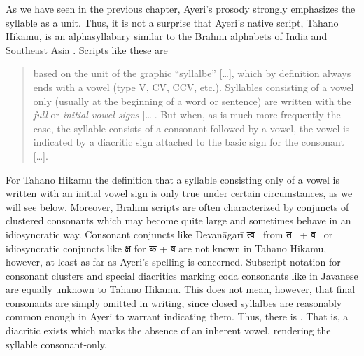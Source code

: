 As we have seen in the previous chapter, Ayeri's prosody strongly emphasizes
the syllable as a unit. Thus, it is not a surprise that Ayeri's native script,
Tahano Hikamu, is an alphasyllabary similar to the Brāhmī
alphabets of India and Southeast Asia \parencites{salomon1996}{court1996}.
Scripts like these are

\blockcquote[376]{salomon1996}{based on the unit of the graphic 
\enquote{syllalbe} […], which by definition always ends with a vowel (type V, 
CV, CCV, etc.). Syllables consisting of a vowel only (usually at the beginning 
of a word or sentence) are written with the \emph{full} or \emph{initial vowel 
signs} […]. But when, as is much more frequently the case, the syllable 
consists of a consonant followed by a vowel, the vowel is indicated by a 
diacritic sign attached to the basic sign for the consonant […].}

For Tahano Hikamu the definition that a syllable consisting only of a vowel is
written with an initial vowel sign is only true under certain circumstances, as
we will see below. Moreover, Brāhmī scripts are often characterized by
conjuncts of clustered consonants which may become quite large and sometimes
behave in an idiosyncratic way. Consonant conjuncts like Devanāgarī {\FS
त्व}~ from {\FS त}~ + {\FS व}~ or idiosyncratic
conjuncts like {\FS क्ष}  for {\FS क}  + {\FS ष} 
are not known in Tahano Hikamu, however, at least as far as Ayeri's spelling is
concerned. Subscript notation for consonant clusters and special diacritics
marking coda consonants like in Javanese \citep[478--479]{kuipersmcdermott1996}
are equally unknown to Tahano Hikamu. This does not mean, however, that final
consonants are simply omitted in writing, since closed syllalbes are reasonably
common enough in Ayeri to warrant indicating them. Thus, there is
. That is, a diacritic exists which marks the absence of an inherent
vowel, rendering the syllable consonant-only.

